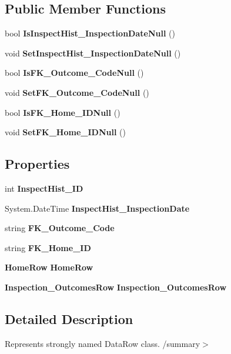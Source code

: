 \subsection*{Public Member Functions}
\begin{DoxyCompactItemize}
\item 
bool \textbf{ Is\+Inspect\+Hist\+\_\+\+Inspection\+Date\+Null} ()
\item 
void \textbf{ Set\+Inspect\+Hist\+\_\+\+Inspection\+Date\+Null} ()
\item 
bool \textbf{ Is\+F\+K\+\_\+\+Outcome\+\_\+\+Code\+Null} ()
\item 
void \textbf{ Set\+F\+K\+\_\+\+Outcome\+\_\+\+Code\+Null} ()
\item 
bool \textbf{ Is\+F\+K\+\_\+\+Home\+\_\+\+I\+D\+Null} ()
\item 
void \textbf{ Set\+F\+K\+\_\+\+Home\+\_\+\+I\+D\+Null} ()
\end{DoxyCompactItemize}
\subsection*{Properties}
\begin{DoxyCompactItemize}
\item 
int \textbf{ Inspect\+Hist\+\_\+\+ID}\hspace{0.3cm}{\ttfamily  [get, set]}
\item 
System.\+Date\+Time \textbf{ Inspect\+Hist\+\_\+\+Inspection\+Date}\hspace{0.3cm}{\ttfamily  [get, set]}
\item 
string \textbf{ F\+K\+\_\+\+Outcome\+\_\+\+Code}\hspace{0.3cm}{\ttfamily  [get, set]}
\item 
string \textbf{ F\+K\+\_\+\+Home\+\_\+\+ID}\hspace{0.3cm}{\ttfamily  [get, set]}
\item 
\textbf{ Home\+Row} \textbf{ Home\+Row}\hspace{0.3cm}{\ttfamily  [get, set]}
\item 
\textbf{ Inspection\+\_\+\+Outcomes\+Row} \textbf{ Inspection\+\_\+\+Outcomes\+Row}\hspace{0.3cm}{\ttfamily  [get, set]}
\end{DoxyCompactItemize}


\subsection{Detailed Description}
Represents strongly named Data\+Row class. /summary$>$ 

